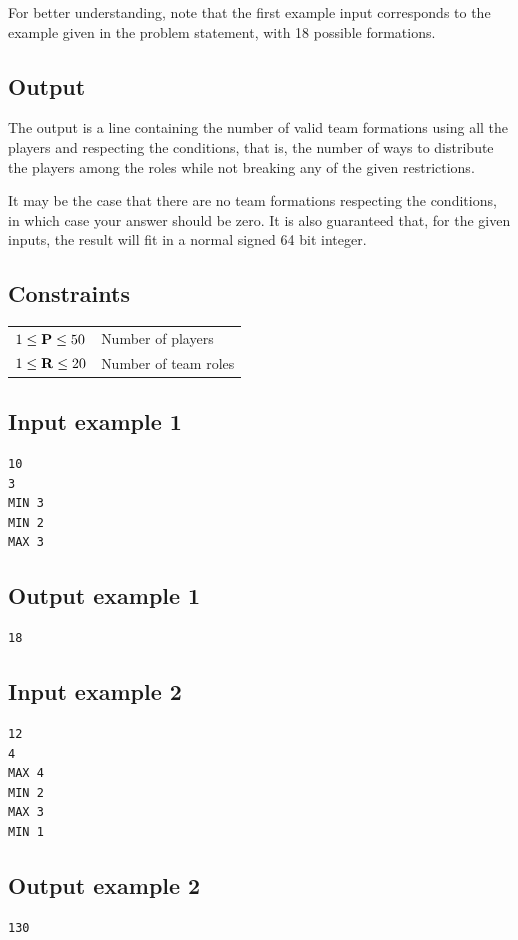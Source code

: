 \documentclass[11pt]{report}
\begin{document}
For better understanding, note that the first example input
corresponds to the example given in the problem statement, with 18
possible formations.

\subsection*{Output}

The output is a line containing the number of valid team formations
using all the players and respecting the conditions, that is, the
number of ways to distribute the players among the roles while not
breaking any of the given restrictions.

It may be the case that there are no team formations respecting the
conditions, in which case your answer should be zero. It is also
guaranteed that, for the given inputs, the result will fit in a normal
signed 64 bit integer.

\subsection*{Constraints}

\begin{tabular}{ l l }
$1 \leq {\bf P} \leq 50$   & Number of players \\
$1 \leq {\bf R} \leq 20$   & Number of team roles
\end{tabular}

\subsection*{Input example 1}
\begin{verbatim}
10
3
MIN 3
MIN 2
MAX 3
\end{verbatim}

\subsection*{Output example 1}
\begin{verbatim}
18
\end{verbatim}

\subsection*{Input example 2}
\begin{verbatim}
12
4
MAX 4
MIN 2
MAX 3
MIN 1
\end{verbatim}

\subsection*{Output example 2}
\begin{verbatim}
130
\end{verbatim}
\end{document}
